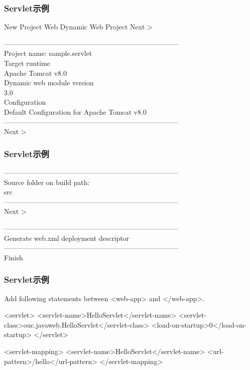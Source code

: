 \begin{frame}[fragile] %
\frametitle{Servlet示例} 

New Project  Web  Dynamic Web Project  Next >

---------------------------------------------------------------------------\\
Project name: {\Blue sample.servlet}\\
Target runtime\\ {\Blue Apache Tomcat v8.0}\\
Dynamic web module version\\ 3.0\\
Configuration\\ {\Blue Default Configuration for Apache Tomcat v8.0}\\
---------------------------------------------------------------------------\\
 Next >
\end{frame}

\begin{frame}[fragile] %
\frametitle{Servlet示例} 

---------------------------------------------------------------------------\\
Source folder on build path: \\ {\Blue src}\\
---------------------------------------------------------------------------\\

 Next >

---------------------------------------------------------------------------\\
{\Blue{}} Generate web.xml deployment descriptor\\
---------------------------------------------------------------------------\\
 Finish
\end{frame}

\begin{frame}[fragile] %
\frametitle{Servlet示例} 


Add following statements between <web-app> and </web-app>.

\begin{xmlCode}
  <servlet>
    <servlet-name>HelloServlet</servlet-name>
    <servlet-class>ouc.javaweb.HelloServlet</servlet-class>
    <load-on-startup>0</load-on-startup>
  </servlet>
    
  <servlet-mapping>
    <servlet-name>HelloServlet</servlet-name>
    <url-pattern>/hello</url-pattern>
  </servlet-mapping>  
\end{xmlCode}
\end{frame}

